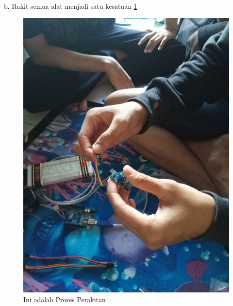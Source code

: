 \documentclass{article}
\begin{document}
 b. Rakit semua alat menjadi satu kesatuan 
  \ref{ar2}
  \begin{figure}[ht]
  \centerline{\includegraphics[width=1\textwidth]{../figures/ar2.jpg}}
  \caption{Ini adalah Proses Perakitan}
  \label{ar2}
  \end{figure}
\end{document}
